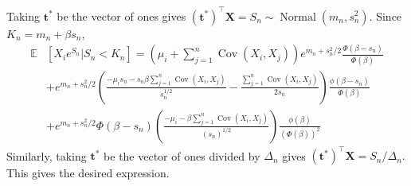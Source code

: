 \documentclass[fleqn,mnsc,nonblindrev]{informs4}
\newcommand{\Normal}{\operatorname{Normal}}
\newcommand{\Cov}{\operatorname{Cov}}
\newcommand{\tb}[1]{\textbf{#1}}
\begin{document}
Taking $\tb{t}^*$ be the vector of ones gives $(\tb{t}^*)^\top\tb{X}=S_n\sim\Normal(m_n,s_n^2).$ 
Since $K_n=m_n+\beta s_n,$
\begin{align*}
\mathbb{E}&\left[X_ie^{S_n}|S_n<K_n\right]=\left(\mu_i+\sum_{j=1}^n\Cov(X_i,X_j)\right)e^{m_n+s_n^2/2}\frac{\Phi\left(\beta-s_n\right)}{\Phi\left(\beta\right)}\\
&+e^{m_n+s_n^2/2}\left(\frac{-\mu_is_n-s_n\beta\sum_{j= 1}^n\Cov(X_i,X_j)}{s_n^{1/2}}-\frac{\sum_{j= 1}^n\Cov(X_i,X_j)}{2s_n}\right)\frac{\phi\left(\beta-s_n\right)}{\Phi\left(\beta\right)}\\
&+e^{m_n+s_n^2/2}\Phi\left(\beta-s_n\right)\left(\frac{-\mu_i-\beta\sum_{j= 1}^n\Cov(X_i,X_j)}{\left(s_n\right)^{1/2}}\right)\frac{\phi\left(\beta\right)}{\left(\Phi\left(\beta\right)\right)^2}
\end{align*}
Similarly, taking $\tb{t}^*$ be the vector of ones divided by $\Delta_n$ gives $(\tb{t}^*)^\top\tb{X}=S_n/\Delta_n.$ This gives the desired expression.
\medskip
\end{document}
